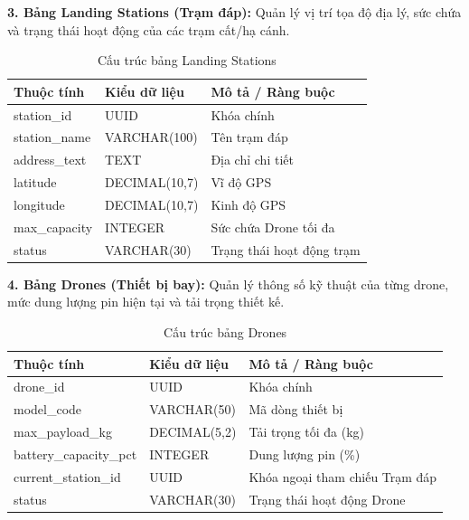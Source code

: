\noindent\textbf{3. Bảng Landing Stations (Trạm đáp):} Quản lý vị trí tọa độ địa lý, sức chứa và trạng thái hoạt động của các trạm cất/hạ cánh.
\begin{table}[htbp]
	\centering
	\begin{tabular}{|l|l|l|}
		\hline
		\textbf{Thuộc tính} & \textbf{Kiểu dữ liệu} & \textbf{Mô tả / Ràng buộc} \\ \hline
		station\_id & UUID & Khóa chính \\ \hline
		station\_name & VARCHAR(100) & Tên trạm đáp \\ \hline
		address\_text & TEXT & Địa chỉ chi tiết \\ \hline
		latitude & DECIMAL(10,7) & Vĩ độ GPS \\ \hline
		longitude & DECIMAL(10,7) & Kinh độ GPS \\ \hline
		max\_capacity & INTEGER & Sức chứa Drone tối đa \\ \hline
		status & VARCHAR(30) & Trạng thái hoạt động trạm \\ \hline
	\end{tabular}
	\caption{Cấu trúc bảng Landing Stations}
\end{table}

\noindent\textbf{4. Bảng Drones (Thiết bị bay):} Quản lý thông số kỹ thuật của từng drone, mức dung lượng pin hiện tại và tải trọng thiết kế.
\begin{table}[htbp]
	\centering
	\begin{tabular}{|l|l|l|}
		\hline
		\textbf{Thuộc tính} & \textbf{Kiểu dữ liệu} & \textbf{Mô tả / Ràng buộc} \\ \hline
		drone\_id & UUID & Khóa chính \\ \hline
		model\_code & VARCHAR(50) & Mã dòng thiết bị \\ \hline
		max\_payload\_kg & DECIMAL(5,2) & Tải trọng tối đa (kg) \\ \hline
		battery\_capacity\_pct & INTEGER & Dung lượng pin (\%) \\ \hline
		current\_station\_id & UUID & Khóa ngoại tham chiếu Trạm đáp \\ \hline
		status & VARCHAR(30) & Trạng thái hoạt động Drone \\ \hline
	\end{tabular}
	\caption{Cấu trúc bảng Drones}
\end{table}

